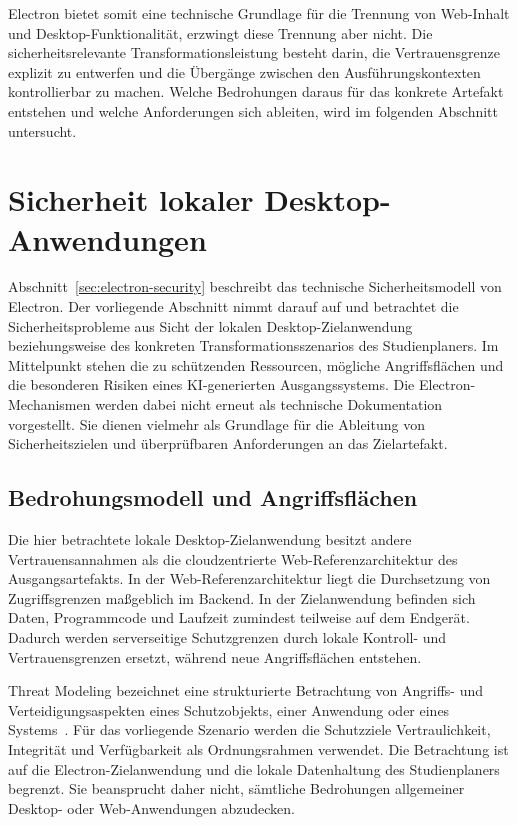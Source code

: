 Electron bietet somit eine technische Grundlage für die Trennung von Web-Inhalt und Desktop-Funktionalität, erzwingt diese Trennung aber nicht.
Die sicherheitsrelevante Transformationsleistung besteht darin, die Vertrauensgrenze explizit zu entwerfen und die Übergänge zwischen den Ausführungskontexten kontrollierbar zu machen.
Welche Bedrohungen daraus für das konkrete Artefakt entstehen und welche Anforderungen sich ableiten, wird im folgenden Abschnitt untersucht.
\section{Sicherheit lokaler Desktop-Anwendungen}
\label{sec:sicherheit-lokaler-desktop-anwendungen}
Abschnitt~\ref{sec:electron-security} beschreibt das technische Sicherheitsmodell von Electron.
Der vorliegende Abschnitt nimmt darauf auf und betrachtet die Sicherheitsprobleme aus Sicht der lokalen Desktop-Zielanwendung beziehungsweise des konkreten Transformationsszenarios des Studienplaners.
Im Mittelpunkt stehen die zu schützenden Ressourcen, mögliche Angriffsflächen und die besonderen Risiken eines KI-generierten Ausgangssystems.
Die Electron-Mechanismen werden dabei nicht erneut als technische Dokumentation vorgestellt.
Sie dienen vielmehr als Grundlage für die Ableitung von Sicherheitszielen und überprüfbaren Anforderungen an das Zielartefakt.
\subsection{Bedrohungsmodell und Angriffsflächen}
\label{sec:bedrohungsmodell}
Die hier betrachtete lokale Desktop-Zielanwendung besitzt andere Vertrauensannahmen als die cloudzentrierte Web-Referenzarchitektur des Ausgangsartefakts.
In der Web-Referenzarchitektur liegt die Durchsetzung von Zugriffsgrenzen maßgeblich im Backend.
In der Zielanwendung befinden sich Daten, Programmcode und Laufzeit zumindest teilweise auf dem Endgerät.
Dadurch werden serverseitige Schutzgrenzen durch lokale Kontroll- und Vertrauensgrenzen ersetzt, während neue Angriffsflächen entstehen.

Threat Modeling bezeichnet eine strukturierte Betrachtung von Angriffs- und Verteidigungsaspekten eines Schutzobjekts, einer Anwendung oder eines Systems~\cite{nist2016threatmodel}.
Für das vorliegende Szenario werden die Schutzziele Vertraulichkeit, Integrität und Verfügbarkeit als Ordnungsrahmen verwendet.
Die Betrachtung ist auf die Electron-Zielanwendung und die lokale Datenhaltung des Studienplaners begrenzt.
Sie beansprucht daher nicht, sämtliche Bedrohungen allgemeiner Desktop- oder Web-Anwendungen abzudecken.

